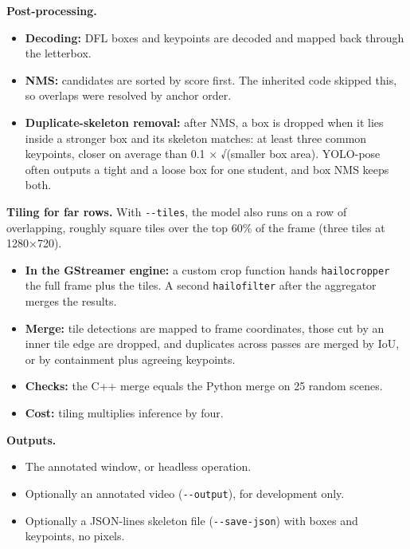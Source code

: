 \textbf{Post-processing.}

\begin{itemize}
\tightlist
\item
  \textbf{Decoding:} DFL boxes and keypoints are decoded and mapped back through the letterbox.
\item
  \textbf{NMS:} candidates are sorted by score first. The inherited code skipped this, so overlaps were resolved by anchor order.
\item
  \textbf{Duplicate-skeleton removal:} after NMS, a box is dropped when it lies inside a stronger box and its skeleton matches: at least three common keypoints, closer on average than 0.1 × √(smaller box area). YOLO-pose often outputs a tight and a loose box for one student, and box NMS keeps both.
\end{itemize}

\textbf{Tiling for far rows.} With \texttt{-\/-tiles}, the model also runs on a row of overlapping, roughly square tiles over the top 60\% of the frame (three tiles at 1280×720).

\begin{itemize}
\tightlist
\item
  \textbf{In the GStreamer engine:} a custom crop function hands \texttt{hailocropper} the full frame plus the tiles. A second \texttt{hailofilter} after the aggregator merges the results.
\item
  \textbf{Merge:} tile detections are mapped to frame coordinates, those cut by an inner tile edge are dropped, and duplicates across passes are merged by IoU, or by containment plus agreeing keypoints.
\item
  \textbf{Checks:} the C++ merge equals the Python merge on 25 random scenes.
\item
  \textbf{Cost:} tiling multiplies inference by four.
\end{itemize}


\textbf{Outputs.}

\begin{itemize}
\tightlist
\item
  The annotated window, or headless operation.
\item
  Optionally an annotated video (\texttt{-\/-output}), for development only.
\item
  Optionally a JSON-lines skeleton file (\texttt{-\/-save-json}) with boxes and keypoints, no pixels.
\end{itemize}

